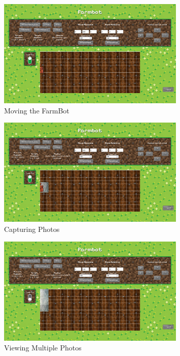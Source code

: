 \begin{figure}[H]
    \centering
    \includegraphics[width=0.8\textwidth]{img/moving_farmbot.png}
    \caption{Moving the FarmBot}
    \label{fig:dashboard_moving_farmbot}
\end{figure}

\begin{figure}[H]
    \centering
    \includegraphics[width=0.8\textwidth]{img/taking_photo.png}
    \caption{Capturing Photos}
    \label{fig:dashboard_capturing_photos}
\end{figure}

\begin{figure}[H]
    \centering
    \includegraphics[width=0.8\textwidth]{img/multiple_photos.png}
    \caption{Viewing Multiple Photos}
    \label{fig:dashboard_viewing_multiple_photos}
\end{figure}

